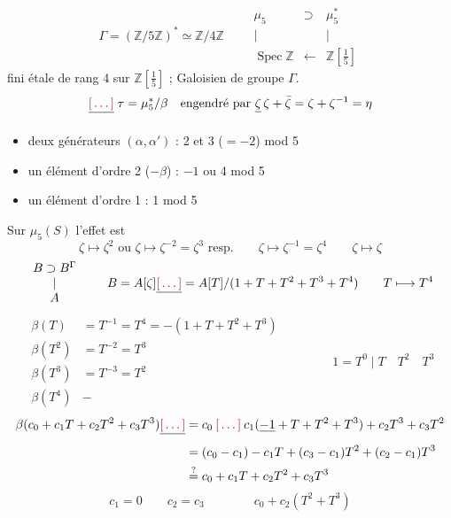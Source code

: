 \documentclass[11pt,a4paper]{article}
\begin{document}
\[
  \Gamma = (\mathbb{Z}/5\mathbb{Z})^{*} \simeq \mathbb{Z}/4\mathbb{Z}
  \qquad
  \begin{array}{ccc}
    \mu_5 & \supset & \mu_5^{*} \\
    | & & | \\
    \operatorname{Spec} \mathbb{Z} & \longleftarrow & \mathbb{Z}[\frac{1}{5}]
  \end{array}
\]
fini étale de rang 4 sur $\mathbb{Z}[\frac{1}{5}]$ ; \struck{\ill{}} Galoisien de groupe $\Gamma$.
\[
  \struck{\ill{}}\; \tau = \mu_5^{*}/\beta \quad \text{engendré par } \struck{\zeta}\, \zeta + \bar\zeta = \zeta + \zeta^{-1} = \eta
\]
\begin{itemize}
  \item deux générateurs $(\alpha, \alpha')$ : 2 et 3 ($= -2$) mod 5
  \item un élément d'ordre 2 ($-\beta$) : $-1$ ou 4 mod 5
  \item un élément d'ordre 1 : 1 mod 5
\end{itemize}
Sur $\mu_5(S)$ l'effet est
\[
  \zeta \mapsto \zeta^{2} \text{ ou } \zeta \mapsto \zeta^{-2} = \zeta^{3} \text{ resp.} \qquad \zeta \mapsto \zeta^{-1} = \zeta^{4} \qquad \zeta \mapsto \zeta
\]
\[
  \begin{array}{c} B \supset B^{\Gamma} \\ | \\ A \end{array}
  \qquad
  B = A[\zeta] \struck{\ill{}} = A[T]/(1 + T + T^{2} + T^{3} + T^{4})
  \qquad T \longmapsto T^{4}
\]
\[
\begin{aligned}
  \beta(T) &= T^{-1} = T^{4} = -(1 + T + T^{2} + T^{3}) \\
  \beta(T^{2}) &= T^{-2} = T^{3} \\
  \beta(T^{3}) &= T^{-3} = T^{2} \\
  \beta(T^{4}) &-
\end{aligned}
\qquad\qquad 1 = T^{0} \mid T \quad T^{2} \quad T^{3}
\]
\[
\begin{aligned}
  \beta(c_0 + c_1 T + c_2 T^{2} + c_3 T^{3}) \struck{\ill{}}
  &= c_0 \mathbin{\ill{}} c_1(\uncertain{-1} + T + T^{2} + T^{3}) + c_2 T^{3} + c_3 T^{2} \\
  &= (c_0 - c_1) - c_1 T + (c_3 - c_1) T^{2} + (c_2 - c_1) T^{3} \\
  &\overset{?}{=} c_0 + c_1 T + c_2 T^{2} + c_3 T^{3}
\end{aligned}
\]
\[
  c_1 = 0 \qquad c_2 = c_3 \qquad\qquad c_0 + c_2 (T^{2} + T^{3})
\]
\end{document}
